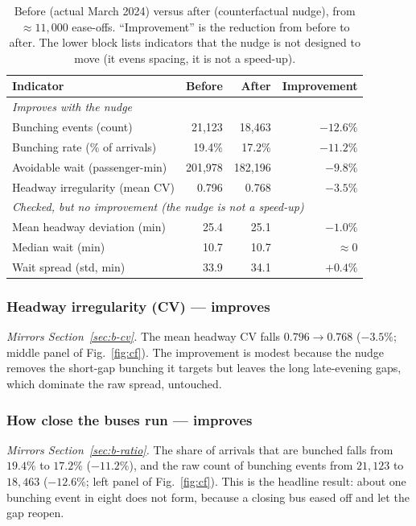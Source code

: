 \documentclass[11pt,a4paper]{article}
\begin{document}
\begin{table}[htbp]
\centering
\small
\caption{Before (actual March 2024) versus after (counterfactual nudge), from $\approx$$11{,}000$
ease-offs. ``Improvement'' is the reduction from before to after. The lower block lists indicators
that the nudge is not designed to move (it evens spacing, it is not a speed-up).}
\label{tab:panel}
\begin{tabular}{lrrr}
\toprule
Indicator & Before & After & Improvement \\
\midrule
\multicolumn{4}{l}{\textit{Improves with the nudge}}\\
Bunching events (count)            & 21{,}123 & 18{,}463 & $-12.6\%$ \\
Bunching rate (\% of arrivals)     & 19.4\%   & 17.2\%   & $-11.2\%$ \\
Avoidable wait (passenger-min)     & 201{,}978& 182{,}196& $-9.8\%$  \\
Headway irregularity (mean CV)     & 0.796    & 0.768    & $-3.5\%$  \\
\midrule
\multicolumn{4}{l}{\textit{Checked, but no improvement (the nudge is not a speed-up)}}\\
Mean headway deviation (min)       & 25.4     & 25.1     & $-1.0\%$  \\
Median wait (min)                  & 10.7     & 10.7     & $\approx 0$ \\
Wait spread (std, min)             & 33.9     & 34.1     & $+0.4\%$  \\
\bottomrule
\end{tabular}
\end{table}

\subsubsection{Headway irregularity (CV) --- improves}
\label{sec:a-cv}
\emph{Mirrors Section~\ref{sec:b-cv}.} The mean headway $\mathrm{CV}$ falls $0.796 \to 0.768$
($-3.5\%$; middle panel of Fig.~\ref{fig:cf}). The improvement is modest because the nudge removes the
short-gap bunching it targets but leaves the long late-evening gaps, which dominate the raw spread,
untouched.

\subsubsection{How close the buses run --- improves}
\label{sec:a-ratio}
\emph{Mirrors Section~\ref{sec:b-ratio}.} The share of arrivals that are bunched falls from $19.4\%$
to $17.2\%$ ($-11.2\%$), and the raw count of bunching events from $21{,}123$ to $18{,}463$
($-12.6\%$; left panel of Fig.~\ref{fig:cf}). This is the headline result: about one bunching event in
eight does not form, because a closing bus eased off and let the gap reopen.
\end{document}
